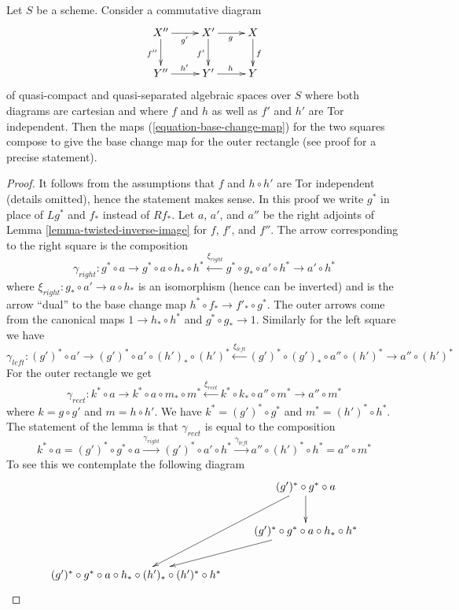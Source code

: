 \begin{lemma}
\label{lemma-compose-base-change-maps-horizontal}
Let $S$ be a scheme. Consider a commutative diagram
$$
\xymatrix{
X'' \ar[r]_{g'} \ar[d]_{f''} & X' \ar[r]_g \ar[d]_{f'} & X \ar[d]^f \\
Y'' \ar[r]^{h'} & Y' \ar[r]^h & Y
}
$$
of quasi-compact and quasi-separated algebraic spaces over $S$ where
both diagrams are cartesian and where $f$ and $h$
as well as $f'$ and $h'$ are Tor independent.
Then the maps (\ref{equation-base-change-map})
for the two squares compose to give the base
change map for the outer rectangle (see proof for a precise statement).
\end{lemma}

\begin{proof}
It follows from the assumptions that $f$ and $h \circ h'$ are Tor
independent (details omitted), hence the statement makes sense.
In this proof we write $g^*$ in place of $Lg^*$ and $f_*$ instead
of $Rf_*$. Let $a$, $a'$, and $a''$ be the right adjoints of
Lemma \ref{lemma-twisted-inverse-image}
for $f$, $f'$, and $f''$. The arrow corresponding to the right
square is the composition
$$
\gamma_{right} :
g^* \circ a \to g^* \circ a \circ h_* \circ h^*
\xleftarrow{\xi_{right}} g^* \circ g_* \circ a' \circ h^* \to a' \circ h^*
$$
where $\xi_{right} : g_* \circ a' \to a \circ h_*$
is an isomorphism (hence can be inverted)
and is the arrow ``dual'' to the base change map
$h^* \circ f_* \to f'_* \circ g^*$. The outer arrows come
from the canonical maps $1 \to h_* \circ h^*$ and $g^* \circ g_* \to 1$.
Similarly for the left square we have
$$
\gamma_{left} :
(g')^* \circ a' \to (g')^* \circ a' \circ (h')_* \circ (h')^*
\xleftarrow{\xi_{left}}
(g')^* \circ (g')_* \circ a'' \circ (h')^* \to a'' \circ (h')^*
$$
For the outer rectangle we get
$$
\gamma_{rect} :
k^* \circ a \to
k^* \circ a \circ m_* \circ m^* \xleftarrow{\xi_{rect}}
k^* \circ k_* \circ a'' \circ m^* \to
a'' \circ m^*
$$
where $k = g \circ g'$ and $m = h \circ h'$.
We have $k^* = (g')^* \circ g^*$ and $m^* = (h')^* \circ h^*$.
The statement of the lemma is that $\gamma_{rect}$
is equal to the composition
$$
k^* \circ a =
(g')^* \circ g^* \circ a \xrightarrow{\gamma_{right}}
(g')^* \circ a' \circ h^* \xrightarrow{\gamma_{left}}
a'' \circ (h')^* \circ h^* = a'' \circ m^*
$$
To see this we contemplate the following diagram
$$
\xymatrix{
& (g')^* \circ g^* \circ a \ar[d] \ar[ddl] \\
& (g')^* \circ g^* \circ a \circ h_* \circ h^* \ar[ld] \\
(g')^* \circ g^* \circ a \circ h_* \circ (h')_* \circ (h')^* \circ h^* &
}$$
\end{proof}
